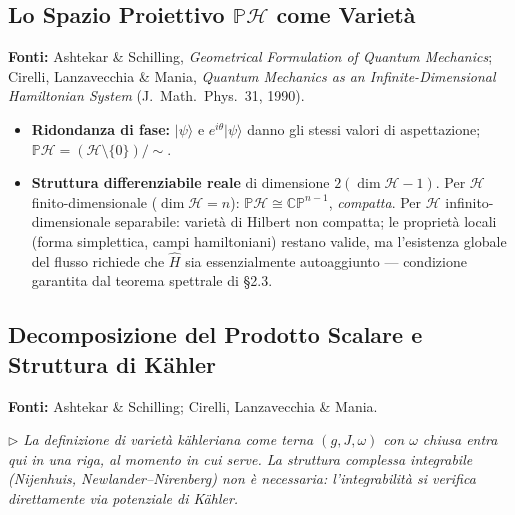 \documentclass[12pt, a4paper]{article}
\newcommand{\fonti}[1]{%
	\begin{fontebox}
		\textcolor{fontecolor}{\footnotesize\textbf{Fonti:} #1}
	\end{fontebox}%
}
\newcommand{\nota}[1]{%
	\par\smallskip
	\noindent\textit{\small $\triangleright$\; #1}
	\par\smallskip
}
\begin{document}
	\subsection{Lo Spazio Proiettivo $\mathbb{P}\mathcal{H}$ come Varietà}
	
	\fonti{Ashtekar \& Schilling, \textit{Geometrical Formulation of Quantum Mechanics};
		Cirelli, Lanzavecchia \& Mania, \textit{Quantum Mechanics as an
			Infinite-Dimensional Hamiltonian System} (J.\ Math.\ Phys.\ 31, 1990).}
	
	\begin{itemize}
		\item \textbf{Ridondanza di fase:} $|\psi\rangle$ e $e^{i\theta}|\psi\rangle$
		danno gli stessi valori di aspettazione; $\mathbb{P}\mathcal{H}=
		(\mathcal{H}\setminus\{0\})/{\sim}$.
		\item \textbf{Struttura differenziabile reale} di dimensione $2(\dim\mathcal{H}-1)$.
		Per $\mathcal{H}$ finito-dimensionale ($\dim\mathcal{H}=n$):
		$\mathbb{P}\mathcal{H}\cong\mathbb{CP}^{n-1}$, \emph{compatta}. Per $\mathcal{H}$
		infinito-dimensionale separabile: varietà di Hilbert non compatta; le proprietà
		locali (forma simplettica, campi hamiltoniani) restano valide, ma l'esistenza
		globale del flusso richiede che $\hat H$ sia essenzialmente autoaggiunto ---
		condizione garantita dal teorema spettrale di \S2.3.
	\end{itemize}
	
	\subsection{Decomposizione del Prodotto Scalare e Struttura di Kähler}
	
	\fonti{Ashtekar \& Schilling; Cirelli, Lanzavecchia \& Mania.}
	
	\nota{La definizione di varietà kähleriana come terna $(g,J,\omega)$ con $\omega$
		chiusa entra qui in una riga, al momento in cui serve. La struttura complessa
		integrabile (Nijenhuis, Newlander--Nirenberg) non è necessaria: l'integrabilità
		si verifica direttamente via potenziale di Kähler.}
	
\end{document}
